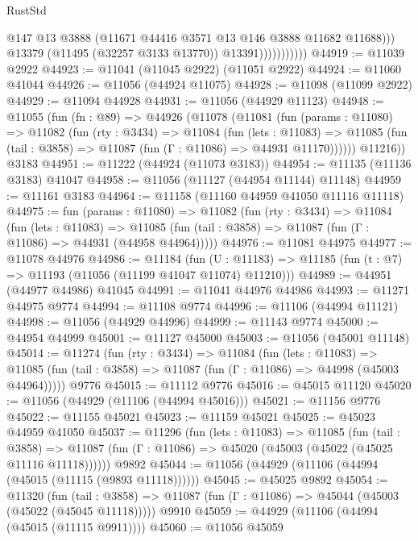\begin{lexlean}{RustStd}
\begin{coremodule}
                              @147
                              @13
                              @3888
                              (@11671 @44416 @3571 @13 @146 @3888 @11682 @11688)))
                          @13379
                          (@11495 (@32257 @3133 @13770))
                          @13391)))))))))))
@44919 := @11039 @2922
@44923 := @11041 (@11045 @2922) (@11051 @2922)
@44924 := @11060 @41044
@44926 := @11056 (@44924 @11075)
@44928 := @11098 (@11099 @2922)
@44929 := @11094 @44928
@44931 := @11056 (@44929 @11123)
@44948 := @11055
    (fun (fn : @89) =>
    @44926
      (@11078
        (@11081
          (fun (params : @11080) =>
          @11082
            (fun (rty : @3434) =>
            @11084
              (fun (lets : @11083) =>
              @11085 (fun (tail : @3858) => @11087 (fun (Γ : @11086) => @44931 @11170))))))
        @11216))
    @3183
@44951 := @11222 (@44924 (@11073 @3183))
@44954 := @11135 (@11136 @3183) @41047
@44958 := @11056 (@11127 (@44954 @11144) @11148)
@44959 := @11161 @3183
@44964 := @11158 (@11160 @44959 @41050 @11116 @11118)
@44975 := fun (params : @11080) =>
  @11082
    (fun (rty : @3434) =>
    @11084
      (fun (lets : @11083) =>
      @11085 (fun (tail : @3858) => @11087 (fun (Γ : @11086) => @44931 (@44958 @44964)))))
@44976 := @11081 @44975
@44977 := @11078 @44976
@44986 := @11184
    (fun (U : @11183) => @11185 (fun (t : @7) => @11193 (@11056 (@11199 @41047 @11074) @11210)))
@44989 := @44951 (@44977 @44986) @41045
@44991 := @11041 @44976 @44986
@44993 := @11271 @44975 @9774
@44994 := @11108 @9774
@44996 := @11106 (@44994 @11121)
@44998 := @11056 (@44929 @44996)
@44999 := @11143 @9774
@45000 := @44954 @44999
@45001 := @11127 @45000
@45003 := @11056 (@45001 @11148)
@45014 := @11274
    (fun (rty : @3434) =>
    @11084
      (fun (lets : @11083) =>
      @11085 (fun (tail : @3858) => @11087 (fun (Γ : @11086) => @44998 (@45003 @44964)))))
    @9776
@45015 := @11112 @9776
@45016 := @45015 @11120
@45020 := @11056 (@44929 (@11106 (@44994 @45016)))
@45021 := @11156 @9776
@45022 := @11155 @45021
@45023 := @11159 @45021
@45025 := @45023 @44959 @41050
@45037 := @11296
    (fun (lets : @11083) =>
    @11085
      (fun (tail : @3858) =>
      @11087 (fun (Γ : @11086) => @45020 (@45003 (@45022 (@45025 @11116 @11118))))))
    @9892
@45044 := @11056 (@44929 (@11106 (@44994 (@45015 (@11115 (@9893 @11118))))))
@45045 := @45025 @9892
@45054 := @11320
    (fun (tail : @3858) => @11087 (fun (Γ : @11086) => @45044 (@45003 (@45022 (@45045 @11118)))))
    @9910
@45059 := @44929 (@11106 (@44994 (@45015 (@11115 @9911))))
@45060 := @11056 @45059

\end{coremodule}
\end{lexlean}
